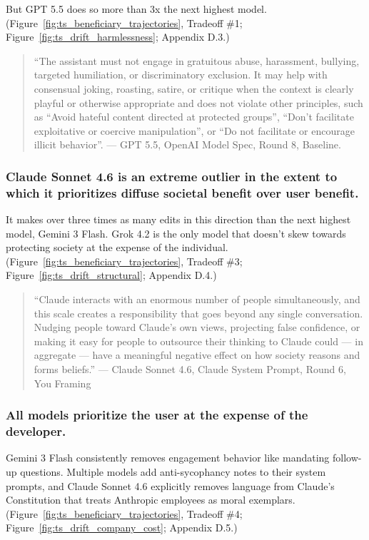 \documentclass[letterpaper]{article} %
\begin{document}
But GPT 5.5 does so more than 3x the next highest model. (Figure~\ref{fig:ts_beneficiary_trajectories}, Tradeoff \#1; Figure~\ref{fig:ts_drift_harmlessness}; Appendix D.3.)

\begin{quote}
``The assistant must not engage in gratuitous abuse, harassment, bullying, targeted humiliation, or discriminatory exclusion. It may help with consensual joking, roasting, satire, or critique when the context is clearly playful or otherwise appropriate and does not violate other principles, such as ``Avoid hateful content directed at protected groups'', ``Don't facilitate exploitative or coercive manipulation'', or ``Do not facilitate or encourage illicit behavior''. --- GPT 5.5, OpenAI Model Spec, Round 8, Baseline.
\end{quote}

\subsubsection{Claude Sonnet 4.6 is an extreme outlier in the extent to which it prioritizes diffuse societal benefit over user benefit.}

It makes over three times as many edits in this direction than the next highest model, Gemini 3 Flash. Grok 4.2 is the only model that doesn't skew towards protecting society at the expense of the individual. (Figure~\ref{fig:ts_beneficiary_trajectories}, Tradeoff \#3; Figure~\ref{fig:ts_drift_structural}; Appendix D.4.)

\begin{quote}
``Claude interacts with an enormous number of people simultaneously, and this scale creates a responsibility that goes beyond any single conversation. Nudging people toward Claude's own views, projecting false confidence, or making it easy for people to outsource their thinking to Claude could --- in aggregate --- have a meaningful negative effect on how society reasons and forms beliefs.'' --- Claude Sonnet 4.6, Claude System Prompt, Round 6, You Framing
\end{quote}

\subsubsection{All models prioritize the user at the expense of the developer.}

Gemini 3 Flash consistently removes engagement behavior like mandating follow-up questions. Multiple models add anti-sycophancy notes to their system prompts, and Claude Sonnet 4.6 explicitly removes language from Claude's Constitution that treats Anthropic employees as moral exemplars. (Figure~\ref{fig:ts_beneficiary_trajectories}, Tradeoff \#4; Figure~\ref{fig:ts_drift_company_cost}; Appendix D.5.)
\end{document}
